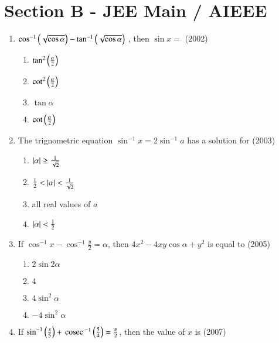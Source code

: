 \documentclass[journal,12pt,twocolumn]{IEEEtran}
\theoremstyle{remark}
\begin{document}
\section*{Section B - JEE Main / AIEEE}
\begin{enumerate}
	\item{
			$\cos^{-1}\left(\sqrt{\cos\alpha}\right)-\tan^{-1}\left(\sqrt{\cos\alpha}\right)$ , then $\sin x =$ \hfill (2002)
		\begin{multicols}{2}
		\begin{enumerate}
			\item{$\tan^2 \left(\frac{\alpha}{2}\right)$}
			\item{$\cot^2 \left(\frac{\alpha}{2}\right)$}
			\columnbreak
			\item{$\tan\alpha$}
			\item{$\cot \left(\frac{\alpha}{2}\right)$}
		\end{enumerate}
		\end{multicols}
	}
	\item{
			The trignometric equation $\sin^{-1} x = 2 \sin^{-1}a$ has a solution for \hfill (2003)
		\begin{multicols}{2}
		\begin{enumerate}
			\item{$\left\vert\alpha\right\vert\geq\frac{1}{\sqrt{2}}$}
			\item{$\frac{1}{2} < \left\vert\alpha\right\vert < \frac{1}{\sqrt{2}}$}
			\columnbreak
			\item{all real values of $a$}
			\item{$\left\vert\alpha\right\vert < \frac{1}{2}$}
		\end{enumerate}
		\end{multicols}
	}
	\item{
			If $\cos^{-1}x - \cos^{-1}\frac{y}{2} = \alpha$, then $4x^2 - 4xy \cos \alpha + y^2$ is equal to \hfill (2005)
		\begin{multicols}{2}
		\begin{enumerate}
			\item{$2 \sin 2\alpha$}
			\item{$4$}
			\columnbreak
			\item{$4 \sin^2 \alpha$}
			\item{$-4 \sin^2 \alpha$}
		\end{enumerate}
		\end{multicols}
	}
	\item{
			If $\sin^{-1} \left(\frac{x}{5}\right) + \,\text{cosec}\,^{-1}\left(\frac{5}{4}\right) = \frac{\pi}{2}$, then the value of $x$ is \hfill (2007)
		\begin{multicols}{2}

\end{multicols}}
\end{enumerate}
\end{document}
